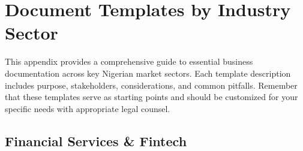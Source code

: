 
\chapter{Document Templates by Industry Sector}

\begin{importantbox}
This appendix provides a comprehensive guide to essential business documentation across key Nigerian market sectors. Each template description includes purpose, stakeholders, considerations, and common pitfalls. Remember that these templates serve as starting points and should be customized for your specific needs with appropriate legal counsel.
\end{importantbox}

\section{Financial Services \& Fintech}

